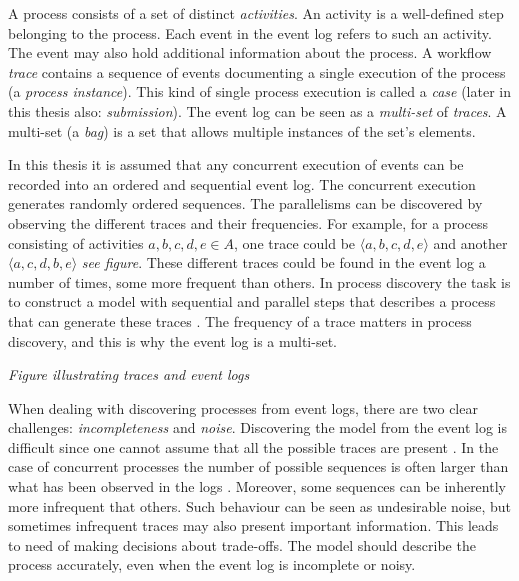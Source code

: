 \documentclass[english,12pt,a4paper,pdftex,sci,utf8]{aaltothesis}
\theoremstyle{definition}
\newcommand{\nyi}[1]{\noindent\colorbox{nyibg}{\textcolor{nyitext}{\emph{#1}}}}
\begin{document}
A process consists of a set of distinct \emph{activities}.
An activity is a well-defined step belonging to the process.
Each event in the event log refers to such an activity.
The event may also hold additional information about the process.
A workflow \emph{trace} contains a sequence of events documenting a single execution of the process (a \emph{process instance}).
This kind of single process execution is called a \emph{case} (later in this thesis also: \emph{submission}).
The event log can be seen as a \emph{multi-set} of \emph{traces}. 
A multi-set (a \emph{bag}) is a set that allows multiple instances of the set's elements. \cite{van2015extracting}

In this thesis it is assumed that any concurrent execution of events can be recorded into
an ordered and sequential event log. 
The concurrent execution generates randomly ordered sequences.
The parallelisms can be discovered by observing the different traces and their frequencies.
For example, for a process consisting of activities $a,b,c,d,e \in A$, one trace could be 
$\langle a,b,c,d,e \rangle$ and another $\langle a,c,d,b,e \rangle$ \nyi{see figure}.
These different traces could be found in the event log a number of times, some more frequent than others.
In process discovery the task is to construct a model with sequential and parallel steps 
that describes a process that can generate these traces \cite{van2013discovering}.
The frequency of a trace matters in process discovery, and this is why the event log is a multi-set.

\nyi{Figure illustrating traces and event logs}

When dealing with discovering processes from event logs, there are two clear challenges: \emph{incompleteness} and \emph{noise}. 
Discovering the model from the event log is difficult since one cannot assume that all the possible traces are present \cite{van2013discovering}. 
In the case of concurrent processes the number of possible sequences is often larger than what has been observed in the logs \cite{van2007business}.
Moreover, some sequences can be inherently more infrequent that others. 
Such behaviour can be seen as undesirable noise, but sometimes infrequent traces may also present important information.
This leads to need of making decisions about trade-offs. 
The model should describe the process accurately, even when the event log is incomplete or noisy.
\end{document}
